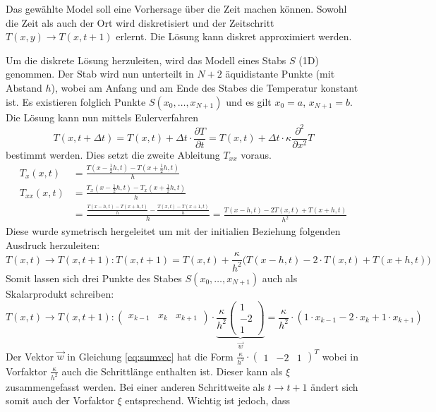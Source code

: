 Das gewählte Model soll eine Vorhersage über die Zeit machen können. Sowohl die Zeit als auch der Ort wird diskretisiert und der Zeitschritt $T(x,y) \rightarrow T(x,t+1)$ erlernt. Die Lösung kann diskret approximiert werden. 

Um die diskrete Lösung herzuleiten, wird das Modell eines Stabs $S$ (1D) genommen. Der Stab wird nun unterteilt in $N+2$ äquidistante Punkte (mit Abstand $h$), wobei am Anfang und am Ende des Stabes die Temperatur konstant ist. Es existieren folglich Punkte $S(x_0, \dots, x_{N+1})$ und es gilt $x_0 = a$, $x_{N+1} = b$. 
Die Lösung kann nun mittels Eulerverfahren
\begin{equation}
T(x,t+\Delta t) = T(x,t) + \Delta t \cdot  \frac{\partial T}{\partial t} = T(x,t) + \Delta t \cdot \kappa \frac{\partial^2}{\partial x^2} T
\end{equation}
bestimmt werden. Dies setzt die zweite Ableitung $T_{xx}$ voraus.
\begin{align}
T_{x}(x, t)  &= \frac{T(x-\frac{1}{2}h, t) - T(x+\frac{1}{2}h, t)}{h}\\
T_{xx}(x, t) &= \frac{T_{x}(x-\frac{1}{2}h, t) - T_{x}(x+\frac{1}{2}h, t)}{h} \\
&= \frac{\frac{T(x-h, t) - T(x+h, t)}{h} - \frac{T(x, t) - T(x+1,t)}{h}}{h} = \frac{T(x-h, t) - 2 T(x, t) + T(x+h, t)}{h^{2}}
\end{align}	
Diese wurde symetrisch hergeleitet um mit der initialien Beziehung folgenden Ausdruck herzuleiten:
\begin{equation}
T(x,t) \rightarrow T(x,t+1) : T(x,t+1) = T(x,t) + \frac{\kappa}{h^{2}} \Big( T(x-h,t) - 2 \cdot T(x,t) + T(x+h,t)  \Big)
\end{equation}
Somit lassen sich drei Punkte des Stabes $S(x_0, \dots, x_{N+1})$ auch als Skalarprodukt schreiben:
\begin{equation}
T(x,t) \rightarrow T(x,t+1) : \begin{pmatrix} x_{k-1} & x_{k} & x_{k+1} \end{pmatrix} \cdot \underbrace{\frac{\kappa}{h^2} \begin{pmatrix} 1 \\ -2 \\ 1 \end{pmatrix}}_{\vec{w}} =  \frac{\kappa}{h^2} \cdot \left( 1 \cdot x_{k-1} - 2 \cdot x_{k} + 1 \cdot x_{k+1} \right)
\label{eq:sumvec}
\end{equation}
Der Vektor $\vec{w}$ in Gleichung \eqref{eq:sumvec} hat die Form  $\frac{\kappa}{h^2} \cdot  \begin{pmatrix} 1 & -2 & 1 \end{pmatrix}^{T}$ wobei in Vorfaktor $\frac{\kappa}{h^2}$ auch die Schrittlänge enthalten ist. Dieser kann als $\xi$ zusammengefasst werden. Bei einer anderen Schrittweite als $t \rightarrow t+1$ ändert sich somit auch der Vorfaktor $\xi$ entsprechend. Wichtig ist jedoch, dass 
